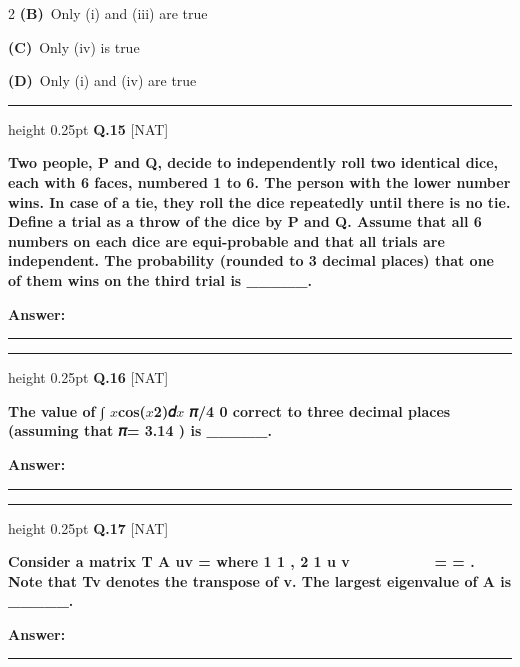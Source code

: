 \documentclass[a4paper,10pt,twoside]{article}
\begin{document}
\begin{multicols}{2}
\textbf{(B)}~Only (i) and (iii) are true\par\vspace{2pt}\noindent
\textbf{(C)}~Only (iv) is true\par\vspace{2pt}\noindent
\textbf{(D)}~Only (i) and (iv) are true
\par\vspace{6pt}\hrule height 0.25pt\vspace{6pt}
\noindent\textbf{Q.15} \hfill {\footnotesize\textsf{[NAT]}}
\par\vspace{2pt}
{\bfseries Two people, P and Q, decide to independently roll two identical dice, each with 6 faces,
numbered 1 to 6. The person with the lower number wins. In case of a tie, they roll the dice
repeatedly until there is no tie. Define a trial as a throw of the dice by P and Q. Assume that
all 6 numbers on each dice are equi-probable and that all trials are independent. The
probability (rounded to 3 decimal places) that one of them wins on the third trial is \_\_\_\_\_. \par}
\par\vspace{3pt}\noindent\textbf{Answer:} \rule{3.2cm}{0.4pt}
\par\vspace{6pt}\hrule height 0.25pt\vspace{6pt}
\noindent\textbf{Q.16} \hfill {\footnotesize\textsf{[NAT]}}
\par\vspace{2pt}
{\bfseries The value of ∫
$x$cos($x$2)𝑑$x$
𝜋/4
0
correct to three decimal places
(assuming that 𝜋= 3.14 ) is \_\_\_\_\_. \par}
\par\vspace{3pt}\noindent\textbf{Answer:} \rule{3.2cm}{0.4pt}
\par\vspace{6pt}\hrule height 0.25pt\vspace{6pt}
\noindent\textbf{Q.17} \hfill {\footnotesize\textsf{[NAT]}}
\par\vspace{2pt}
{\bfseries Consider a matrix
T
A
uv
=
where
1
1
,
2
1
u
v






=
=
. Note that
Tv denotes the
transpose of v. The largest eigenvalue of A is \_\_\_\_\_. \par}
\par\vspace{3pt}\noindent\textbf{Answer:} \rule{3.2cm}{0.4pt}

\end{multicols}
\end{document}
